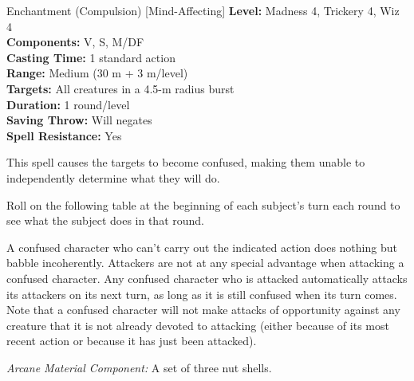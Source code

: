 {Enchantment (Compulsion) [Mind-Affecting]}
{
	\textbf{Level:}
	Madness 4, Trickery 4, Wiz 4\\
	\textbf{Components:}
	V, S, M/DF\\
	\textbf{Casting Time:}
	1 standard action\\
	\textbf{Range:}
	Medium (30 m + 3 m/level)\\
	\textbf{Targets:}
	All creatures in a 4.5-m radius burst\\
	\textbf{Duration:}
	1 round/level\\
	\textbf{Saving Throw:}
	Will negates\\
	\textbf{Spell Resistance:}
	Yes\\
}
{
	This spell causes the targets to become confused, making them unable to independently determine what they will do.

	Roll on the following table at the beginning of each subject's turn each round to see what the subject does in that round.


	A confused character who can't carry out the indicated action does nothing but babble incoherently. Attackers are not at any special advantage when attacking a confused character. Any confused character who is attacked automatically attacks its attackers on its next turn, as long as it is still confused when its turn comes. Note that a confused character will not make attacks of opportunity against any creature that it is not already devoted to attacking (either because of its most recent action or because it has just been attacked).

	\textit{Arcane Material Component:}
	A set of three nut shells.

}
